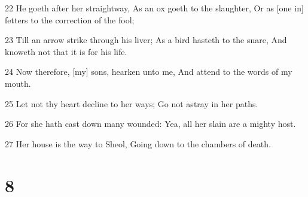 \par 22 He goeth after her straightway, As an ox goeth to the slaughter, Or as [one in] fetters to the correction of the fool;
\par 23 Till an arrow strike through his liver; As a bird hasteth to the snare, And knoweth not that it is for his life.
\par 24 Now therefore, [my] sons, hearken unto me, And attend to the words of my mouth.
\par 25 Let not thy heart decline to her ways; Go not astray in her paths.
\par 26 For she hath cast down many wounded: Yea, all her slain are a mighty host.
\par 27 Her house is the way to Sheol, Going down to the chambers of death.

\chapter{8}

